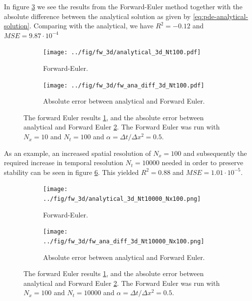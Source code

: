 In figure \ref{fig:3d-fw-comparison-plots} we see the results from the Forward-Euler method together with the absolute difference between the analytical solution as given by \eqref{eq:pde-analytical-solution}. Comparing with the analytical, we have $R^2=-0.12$ and $MSE=9.87\cdot 10^{-4}$
\begin{figure}[h!tb]
    \centering
    \begin{subfigure}{0.5\textwidth}
        \centering
        \texttt{[image: ../fig/fw\_3d/analytical\_3d\_Nt100.pdf]}
        \caption{Forward-Euler.}
        \label{fig:fw-3d}
    \end{subfigure}
    \begin{subfigure}{0.5\textwidth}
        \centering
        \texttt{[image: ../fig/fw\_3d/fw\_ana\_diff\_3d\_Nt100.pdf]}
        \caption{Absolute error between analytical and Forward Euler.}
        \label{fig:fw-ana-diff-3d}
    \end{subfigure}
    \caption{The forward Euler results \ref{fig:fw-3d}, and the absolute error between analytical and Forward Euler \ref{fig:fw-ana-diff-3d}. The Forward Euler was run with $N_x=10$ and $N_t=100$ and $\alpha=\Delta t / \Delta x^2=0.5$.}
    \label{fig:3d-fw-comparison-plots}
\end{figure}

As an example, an increased spatial resolution of $N_x=100$ and subsequently the required increase in temporal resolution $N_t=10000$ needed in order to preserve stability can be seen in figure \ref{fig:3d-fw-comparison-plots-spatial-highres}. This yielded $R^2=0.88$ and $MSE=1.01\cdot 10^{-5}$.
\begin{figure}[h!tb]
    \centering
    \begin{subfigure}{0.5\textwidth}
        \centering
        \texttt{[image: ../fig/fw\_3d/analytical\_3d\_Nt10000\_Nx100.png]}
        \caption{Forward-Euler.}
        \label{fig:fw-3d-highres}
    \end{subfigure}
    \begin{subfigure}{0.5\textwidth}
        \centering
        \texttt{[image: ../fig/fw\_3d/fw\_ana\_diff\_3d\_Nt10000\_Nx100.png]}
        \caption{Absolute error between analytical and Forward Euler.}
        \label{fig:fw-ana-diff-3d-highres}
    \end{subfigure}
    \caption{The forward Euler results \ref{fig:fw-3d}, and the absolute error between analytical and Forward Euler \ref{fig:fw-ana-diff-3d}. The Forward Euler was run with $N_x=100$ and $N_t=10000$ and $\alpha=\Delta t / \Delta x^2=0.5$.}
    \label{fig:3d-fw-comparison-plots-spatial-highres}
\end{figure}

